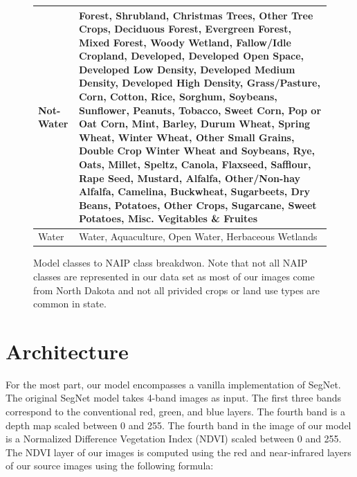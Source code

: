 \documentclass[12pt]{article}
\begin{document}
\begin{figure}
  \begin{tabular}[]{|p{2cm}|p{12cm}|}
  \hline
  Not-Water & Forest, Shrubland, Christmas Trees, Other Tree Crops, Deciduous Forest, Evergreen Forest, Mixed Forest, Woody Wetland, Fallow/Idle Cropland, Developed, Developed Open Space, Developed Low Density, Developed Medium Density, Developed High Density, Grass/Pasture, Corn, Cotton, Rice, Sorghum, Soybeans, Sunflower, Peanuts, Tobacco, Sweet Corn, Pop or Oat Corn, Mint, Barley, Durum Wheat, Spring Wheat, Winter Wheat, Other Small Grains, Double Crop Winter Wheat and Soybeans, Rye, Oats, Millet, Speltz, Canola, Flaxseed, Safflour, Rape Seed, Mustard, Alfalfa, Other/Non-hay Alfalfa, Camelina, Buckwheat, Sugarbeets, Dry Beans, Potatoes, Other Crops, Sugarcane, Sweet Potatoes, Misc. Vegitables \& Fruites \\ \hline
  Water & Water, Aquaculture, Open Water, Herbaceous Wetlands \\ \hline
  \end{tabular}
  \caption{Model classes to NAIP class breakdwon. Note that not all NAIP classes are represented in our data set as most of our images come from North Dakota and not all privided crops or land use types are common in state.}
\end{figure}


\begin{figure}
\end{figure}



\section{Architecture}

For the most part, our model encompasses a vanilla implementation of SegNet. The original SegNet model takes 4-band images as input. The first three bands correspond to the conventional red, green, and blue layers. The fourth band is a depth map scaled between 0 and 255. The fourth band in the image of our model is a Normalized Difference Vegetation Index (NDVI)\cite{NDVI} scaled between 0 and 255. The NDVI layer of our images is computed using the red and near-infrared layers of our source images using the following formula:  
\begin{figure}[!htb]
\end{figure}
\end{document}
